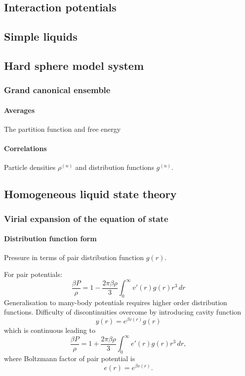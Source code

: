 \subsection{Interaction potentials}
\subsection{Simple liquids}
\subsection{Hard sphere model system}

\subsubsection{Grand canonical ensemble}
\paragraph{Averages}
The partition function and free energy
\paragraph{Correlations}
Particle densities $\rho^{(n)}$ and distribution functions $g^{(n)}$.

\subsection{Homogeneous liquid state theory}

\subsubsection{Virial expansion of the equation of state}

\paragraph{Distribution function form}
Pressure in terms of pair distribution function $g(r)$.

For pair potentials:
\begin{equation}
  \frac{\beta P}{\rho} =
  1 - \frac{2 \pi \beta \rho}{3}
  \int_0^\infty v'(r) g(r) r^3 \, dr
\end{equation}
Generalisation to many-body potentials requires higher order distribution functions.
Difficulty of discontinuities overcome by introducing cavity function
\begin{equation}
  y(r) = e^{\beta v(r)} g(r)
\end{equation}
which is continuous  leading to
\begin{equation}
  \frac{\beta P}{\rho} =
  1 + \frac{2 \pi \beta \rho}{3}
  \int_0^\infty e'(r) g(r) r^3 \, dr,
\end{equation}
where Boltzmann factor of pair potential is
\begin{equation}
  e(r) = e^{\beta v(r)}.
\end{equation}

